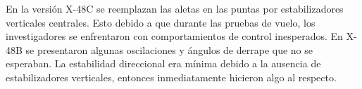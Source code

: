  
En la versión X-48C se reemplazan las aletas en las puntas por estabilizadores verticales centrales. Esto debido a que durante las pruebas de vuelo, los investigadores se enfrentaron con comportamientos de control inesperados. 
En X-48B se presentaron algunas oscilaciones y ángulos de derrape que no se esperaban. La estabilidad direccional era mínima debido a la ausencia de estabilizadores verticales, entonces inmediatamente hicieron algo al respecto. 

%
%
%
%
\bigskip


